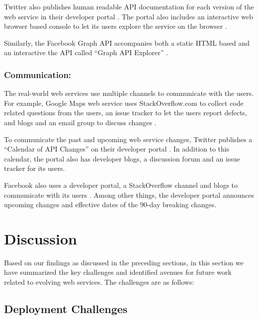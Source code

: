 \documentclass[runningheads,a4paper]{llncs}
\begin{document}
Twitter also publishes human readable API documentation for each version of the web service in their developer portal \cite{twitter_api}. The portal also includes an interactive web browser based console to let its users explore the service on the browser \cite{twitter_console}.

Similarly, the Facebook Graph API accompanies both a static HTML based and an interactive the API called ``Graph API Explorer'' \cite{facebook_api}.

\subsubsection{Communication:}

The real-world web services use multiple channels to communicate with the users. For example, Google Maps web service uses StackOverflow.com to collect code related questions from the users, an issue tracker to let the users report defects, and blogs and an email group to discuss changes \cite{google_maps_forum}.

To communicate the past and upcoming web service changes, Twitter publishes a ``Calendar of API Changes'' on their developer portal \cite{twitter_calendar}. In addition to this calendar, the portal also has developer blogs, a discussion forum and an issue tracker for its users.

Facebook also uses a developer portal, a StackOverflow channel and blogs to communicate with its users \cite{facebook_stack_overflow}. Among other things, the developer portal announces upcoming changes and effective dates of the 90-day breaking changes.


\section{Discussion} %
\label{sec:discussion}

Based on our findings as discussed in the preceding sections, in this section we have summarized the key challenges and identified avenues for future work related to evolving web services. The challenges are as follows:

\subsection{Deployment Challenges} %
\label{sub:deployment_challenges}
\end{document}
